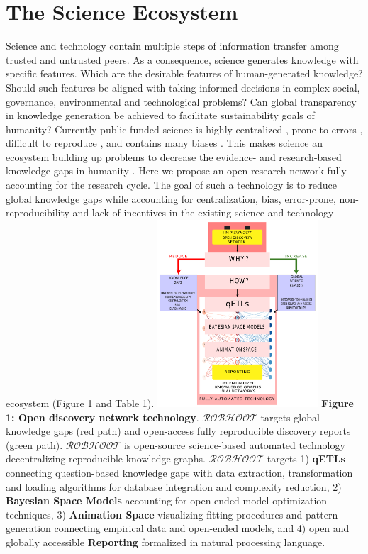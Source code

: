 \documentclass[10pt, a4paper, twocolumn]{article} %
\begin{document}
{ 
\section{The Science Ecosystem}
Science and technology contain multiple steps of information transfer
among trusted and untrusted peers. As a consequence, science generates
knowledge with specific features. Which are the desirable features of
human-generated knowledge? Should such features be aligned with taking
informed decisions in complex social, governance, environmental and
technological problems? Can global transparency in knowledge
generation be achieved to facilitate sustainability goals of humanity?
Currently public funded science is highly centralized
\citep{Inhaber1977,Gunther2018}⁠⁠, prone to errors \citep{Fang2011},
difficult to reproduce \citep{Hardwicke2018}, and contains many biases
\citep{Ioannidis2005}. This makes science an ecosystem building up
problems to decrease the evidence- and research-based knowledge gaps
in humanity \citep{Mastrangelo2019}. Here we propose an open research
network fully accounting for the research cycle. The goal of such a
technology is to reduce global knowledge gaps while accounting for
centralization, bias, error-prone, non-reproducibility and lack of
incentives in the existing science and technology ecosystem (Figure 1
and Table 1).
\includegraphics[width=0.45\textwidth]{flowchart.pdf} {\small {\bf
    Figure 1: Open discovery network technology}. {\bf
    $\mathcal{ROBHOOT}$} targets global knowledge gaps (red path) and
  open-access fully reproducible discovery reports (green
  path). $\mathcal{ROBHOOT}$ is open-source science-based automated
  technology decentralizing reproducible knowledge
  graphs. $\mathcal{ROBHOOT}$} targets 1) {\bf qETLs} connecting
question-based knowledge gaps with data extraction, transformation and
loading algorithms for database integration and complexity reduction,
2) {\bf Bayesian Space Models} accounting for open-ended model
optimization techniques, 3) {\bf Animation Space} visualizing fitting
procedures and pattern generation connecting empirical data and
open-ended models, and 4) open and globally accessible {\bf Reporting}
formalized in natural processing language.}
\end{document}
